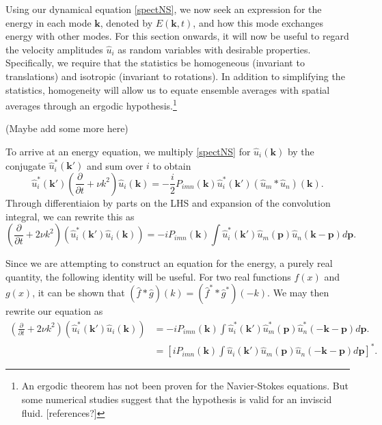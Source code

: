\documentclass[letterpaper, 11pt, onecolumn, oneside]{article}
\newcommand{\pdiff}[2]{\frac{\partial #1}{\partial #2}}
\begin{document}
Using our dynamical equation \eqref{spectNS}, we now seek an expression for the energy in each mode $\bm{k}$, denoted by $E(\bm{k},t)$, and how this mode exchanges energy with other modes. For this section onwards, it will now be useful to regard the velocity amplitudes $\hat{u}_i$ as random variables with desirable properties. Specifically, we require that the statistics be homogeneous (invariant to translations) and isotropic (invariant to rotations). In addition to simplifying the statistics, homogeneity will allow us to equate ensemble averages with spatial averages through an ergodic hypothesis.\footnote{An ergodic theorem has not been proven for the Navier-Stokes equations. But some numerical studies suggest that the hypothesis is valid for an inviscid fluid. [references?]}

(Maybe add some more here)

To arrive at an energy equation, we multiply \eqref{spectNS} for $\hat{u}_i(\bm{k})$ by the conjugate $\hat{u}^*_i(\bm{k}')$ and sum over $i$ to obtain
\begin{equation}
	\hat{u}^*_i(\bm{k}') \left(\pdiff{}{t} + \nu k^2 \right) \hat{u}_i(\bm{k}) = -\frac{i}{2} P_{imn}(\bm{k}) \hat{u}^*_i(\bm{k}') (\hat{u}_m * \hat{u}_n)(\bm{k}).
\end{equation}
Through differentiaion by parts on the LHS and expansion of the convolution integral, we can rewrite this as
\begin{equation}
	\left(\pdiff{}{t} + 2 \nu k^2 \right) (\hat{u}^*_i(\bm{k}') \hat{u}_i(\bm{k})) = - i P_{imn}(\bm{k}) \int \hat{u}^*_i(\bm{k}') \hat{u}_m(\bm{p}) \hat{u}_n(\bm{k} - \bm{p}) d\bm{p}.
\end{equation}

Since we are attempting to construct an equation for the energy, a purely real quantity, the following identity will be useful. For two real functions $f(x)$ and $g(x)$, it can be shown that $(\hat{f} * \hat{g})(k) = (\hat{f}^{*} \!* \hat{g}^*)(-k)$. We may then rewrite our equation as
\begin{equation}
\begin{split}
	\left(\pdiff{}{t} + 2 \nu k^2 \right) (\hat{u}^*_i(\bm{k}') \hat{u}_i(\bm{k})) & = - i P_{imn}(\bm{k}) \int \hat{u}^*_i(\bm{k}') \hat{u}^*_m(\bm{p}) \hat{u}^*_n(-\bm{k} - \bm{p}) d\bm{p}. \\
	& = \left[i P_{imn}(\bm{k}) \int \hat{u}_i(\bm{k}') \hat{u}_m(\bm{p}) \hat{u}_n(-\bm{k} - \bm{p}) d\bm{p}\right]^*.
\end{split}
\end{equation}
\end{document}
